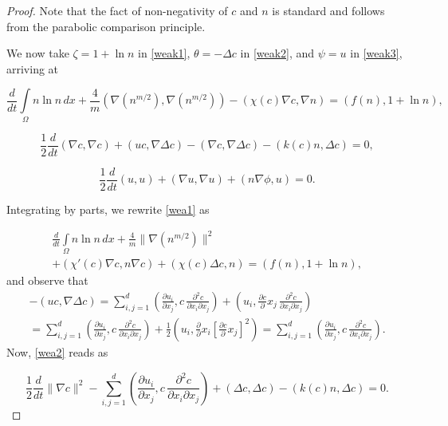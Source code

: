 \documentclass[10pt]{amsart}
\begin{document}
\begin{proof}
Note that the fact of non-negativity of $c$ and $n$ is standard and follows from the parabolic comparison principle. 

We now take $\zeta= 1+\ln n$ in \eqref{weak1}, $\theta= -\Delta c$ in \eqref{weak2}, and $\psi= u$ in \eqref{weak3}, arriving at

\begin{equation}\label{wea1}
\frac {d}{dt} \int\limits_{\Omega} n\ln n \, dx + \frac 4 m (\nabla(n^{m/2}),\nabla(n^{m/2}))-(\chi (c) \nabla c,\nabla n)=(f(n),1+\ln n),
\end{equation}

\begin{equation}\label{wea2}
\frac 1 2 \frac {d}{dt} (\nabla c,\nabla c) + (u c,\nabla \Delta c)-(\nabla c,\nabla\Delta c) -(k(c) n,\Delta c)=0,
\end{equation}

\begin{equation}\label{wea3}
\frac 1 2  \frac {d}{dt} (u,u) + (\nabla u,\nabla u) +(n \nabla
\phi,u)=0.
\end{equation}

Integrating by parts, we rewrite \eqref{wea1} as 

\begin{multline}\label{wea11}
\frac {d}{dt} \int\limits_{\Omega} n\ln n \, dx + \frac 4 m \|\nabla(n^{m/2})\|^2 \\ +(\chi' (c) \nabla c,n \nabla c )+(\chi (c) \Delta c, n)=(f(n),1+\ln n),
\end{multline}
and observe that \begin{multline} -(u c,\nabla \Delta c)=  \sum\limits^d _ {i,j=1}  \left({\frac{\partial {u_i}}{\partial {x_j}}} , c\, \frac{\partial^2 c}{\partial x_i \partial x_j} \right)+\left(u_i , {\frac{\partial c}{\partial  }}{x_j}\, \frac{\partial^2 c}{\partial x_i \partial x_j} \right) \\ = \sum\limits^d _ {i,j=1}  \left({\frac{\partial {u_i}}{\partial {x_j}}} , c\, \frac{\partial^2 c}{\partial x_i \partial x_j} \right)+\frac 12 \left( u_i , {\frac{\partial {}}{\partial  }}{x_i}\left[{\frac{\partial c}{\partial  }}{x_j} \right]^2\right)=\sum\limits^d _ {i,j=1}  \left({\frac{\partial {u_i}}{\partial {x_j}}} , c\, \frac{\partial^2 c}{\partial x_i \partial x_j} \right). \end{multline} Now, \eqref{wea2} reads as 

\begin{equation}\label{wea21}
\frac 1 2 \frac {d}{dt} \|\nabla c\|^2 - \sum\limits^d _ {i,j=1} \left({\frac{\partial {u_i}}{\partial {x_j}}} , c\, \frac{\partial^2 c}{\partial x_i \partial x_j} \right)+(\Delta c,\Delta c) -(k(c) n,\Delta c)=0.
\end{equation}


\end{proof}
\end{document}
